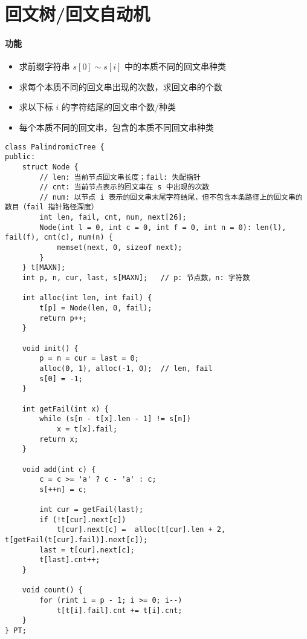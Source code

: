 \section{回文树/回文自动机}
\paragraph{功能}
\begin{itemize}
\item 求前缀字符串 $s[0] \sim s[i]$ 中的本质不同的回文串种类
\item 求每个本质不同的回文串出现的次数，求回文串的个数
\item 求以下标 $i$ 的字符结尾的回文串个数/种类
\item 每个本质不同的回文串，包含的本质不同回文串种类
\end{itemize}
\begin{verbatim}
class PalindromicTree {
public:
    struct Node {
        // len: 当前节点回文串长度；fail: 失配指针
        // cnt: 当前节点表示的回文串在 s 中出现的次数
        // num: 以节点 i 表示的回文串末尾字符结尾，但不包含本条路径上的回文串的数目（fail 指针路径深度） 
        int len, fail, cnt, num, next[26];
        Node(int l = 0, int c = 0, int f = 0, int n = 0): len(l), fail(f), cnt(c), num(n) {
            memset(next, 0, sizeof next);
        }
    } t[MAXN];
    int p, n, cur, last, s[MAXN];	// p: 节点数，n: 字符数
    
    int alloc(int len, int fail) {
        t[p] = Node(len, 0, fail);
        return p++;
    }
    
    void init() {
        p = n = cur = last = 0;
        alloc(0, 1), alloc(-1, 0);	// len, fail
        s[0] = -1;
    }
    
    int getFail(int x) {
        while (s[n - t[x].len - 1] != s[n])
            x = t[x].fail;
        return x;
    }
    
    void add(int c) {
        c = c >= 'a' ? c - 'a' : c;
        s[++n] = c;
        
        int cur = getFail(last);
        if (!t[cur].next[c])
            t[cur].next[c] =  alloc(t[cur].len + 2, t[getFail(t[cur].fail)].next[c]);
        last = t[cur].next[c];
        t[last].cnt++;
    }
    
    void count() {
        for (rint i = p - 1; i >= 0; i--)
            t[t[i].fail].cnt += t[i].cnt;
    }
} PT;
\end{verbatim}

